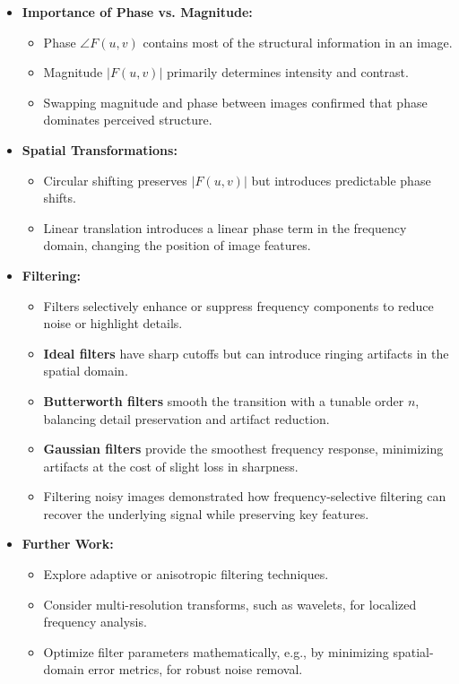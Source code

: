 \documentclass[12pt, a4paper]{AnantDocumentation}
\begin{document}
\begin{itemize}
    \item \textbf{Importance of Phase vs. Magnitude:} 
    \begin{itemize}
        \item Phase \(\angle F(u,v)\) contains most of the structural information in an image.
        \item Magnitude \(|F(u,v)|\) primarily determines intensity and contrast.
        \item Swapping magnitude and phase between images confirmed that phase dominates perceived structure.
    \end{itemize}
    
    \item \textbf{Spatial Transformations:} 
    \begin{itemize}
        \item Circular shifting preserves \(|F(u,v)|\) but introduces predictable phase shifts.
        \item Linear translation introduces a linear phase term in the frequency domain, changing the position of image features.
    \end{itemize}
    
    \item \textbf{Filtering:} 
    \begin{itemize}
        \item Filters selectively enhance or suppress frequency components to reduce noise or highlight details.
        \item \textbf{Ideal filters} have sharp cutoffs but can introduce ringing artifacts in the spatial domain.
        \item \textbf{Butterworth filters} smooth the transition with a tunable order \(n\), balancing detail preservation and artifact reduction.
        \item \textbf{Gaussian filters} provide the smoothest frequency response, minimizing artifacts at the cost of slight loss in sharpness.
        \item Filtering noisy images demonstrated how frequency-selective filtering can recover the underlying signal while preserving key features.
    \end{itemize}
    
    \item \textbf{Further Work:}
    \begin{itemize}
        \item Explore adaptive or anisotropic filtering techniques.
        \item Consider multi-resolution transforms, such as wavelets, for localized frequency analysis.
        \item Optimize filter parameters mathematically, e.g., by minimizing spatial-domain error metrics, for robust noise removal.
    \end{itemize}
\end{itemize}
\end{document}
